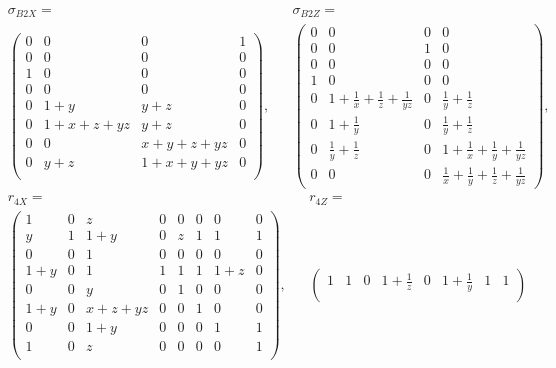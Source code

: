{\small
\begin{align*}
&\sigma_{B2X} =                    & & \sigma_{B2Z} = \\
&\left(
\begin{array}{c|cc|c}
 0 & 0 & 0 & 1 \\
 0 & 0 & 0 & 0 \\
 1 & 0 & 0 & 0 \\
 0 & 0 & 0 & 0 \\
\hline
 0 & 1+y & y+z & 0       \\
 0 & 1+x+z+y z & y+z & 0 \\
 0 & 0 & x+y+z+y z & 0   \\
 0 & y+z & 1+x+y+y z & 0 \\
\end{array}
\right),
& &
\left(\begin{array}{c|c|c|c}
 0 & 0 & 0 & 0 \\
 0 & 0 & 1 & 0 \\
 0 & 0 & 0 & 0 \\
 1 & 0 & 0 & 0 \\
\hline
 0 & 1+\frac{1}{x}+\frac{1}{z}+\frac{1}{y z} & 0 & \frac{1}{y}+\frac{1}{z} \\
 0 & 1+\frac{1}{y} & 0 & \frac{1}{y}+\frac{1}{z} \\
 0 & \frac{1}{y}+\frac{1}{z} & 0 & 1+\frac{1}{x}+\frac{1}{y}+\frac{1}{y z} \\
 0 & 0 & 0 & \frac{1}{x}+\frac{1}{y}+\frac{1}{z}+\frac{1}{y z}
\end{array}\right),
\end{align*}
\begin{align*}
& r_{4X} = &  & r_{4Z} = \\
& \begin{pmatrix}
 1 & 0 & z & 0 & 0 & 0 & 0 & 0    \\
 y & 1 & 1+y & 0 & z & 1 & 1 & 1  \\
 0 & 0 & 1 & 0 & 0 & 0 & 0 & 0    \\
 1+y & 0 & 1 & 1 & 1 & 1 & 1+z & 0\\
 0 & 0 & y & 0 & 1 & 0 & 0 & 0         \\
 1+y & 0 & x+z+y z & 0 & 0 & 1 & 0 & 0 \\
 0 & 0 & 1+y & 0 & 0 & 0 & 1 & 1       \\
 1 & 0 & z & 0 & 0 & 0 & 0 & 1         \\
\end{pmatrix},
& &
\begin{pmatrix}
 1 & 1 & 0 & 1+\frac{1}{z} & 0 & 1+\frac{1}{y} & 1 & 1 \\

\end{pmatrix}
\end{align*}}
